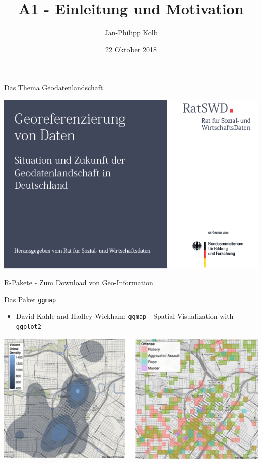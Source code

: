\documentclass[ignorenonframetext,]{beamer}
\title{A1 - Einleitung und Motivation}
\author{Jan-Philipp Kolb}
\date{22 Oktober 2018}
\providecommand{\tightlist}{%
  \setlength{\itemsep}{0pt}\setlength{\parskip}{0pt}}
\begin{document}
\frame{\titlepage}

\begin{frame}{Das Thema Geodatenlandschaft}

\includegraphics{figure/BildRatSWDBericht.png}

\end{frame}

\begin{frame}[fragile]{R-Pakete - Zum Download von Geo-Information}

\begin{block}{\href{https://sites.google.com/site/davidkahle/ggmap}{Das
Paket \texttt{ggmap}}}

\begin{itemize}
\tightlist
\item
  David Kahle and Hadley Wickham: \texttt{ggmap} - Spatial Visualization
  with \texttt{ggplot2}
\end{itemize}

\includegraphics{figure/Rgeopackages.PNG}

\end{block}

\end{frame}
\end{document}
